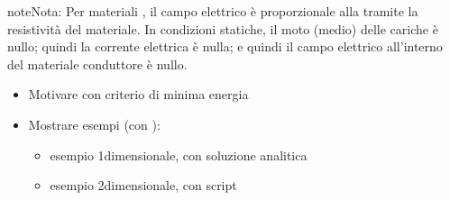 \documentclass[letterpaper,10pt,italian]{jupyterBook}
\begin{document}
\begin{sphinxadmonition}{note}{Nota:}
\sphinxAtStartPar
Per materiali {\hyperref[\detokenize{ch/electromagnetism/electric-current:physics-hs-electromagnetism-electric-current-solids-conductor-ohm}]{}}, il campo elettrico è proporzionale alla {\hyperref[\detokenize{ch/electromagnetism/electric-current:electric-current-density-def}]{}} tramite la resistività del materiale. In condizioni statiche, il moto (medio) delle cariche è nullo; quindi la corrente elettrica è nulla; e quindi il campo elettrico all’interno del materiale conduttore è nullo.

\sphinxAtStartPar
{}
\begin{itemize}
\item {} 
\sphinxAtStartPar
Motivare con criterio di minima energia

\item {} 
\sphinxAtStartPar
Mostrare esempi (con ):
\begin{itemize}
\item {} 
\sphinxAtStartPar
esempio 1\sphinxhyphen{}dimensionale, con soluzione analitica

\item {} 
\sphinxAtStartPar
esempio 2\sphinxhyphen{}dimensionale, con script

\end{itemize}

\end{itemize}
\end{sphinxadmonition}
\label{ch/electromagnetism/electrostatics:charge-sphere:conductor}
\end{document}
